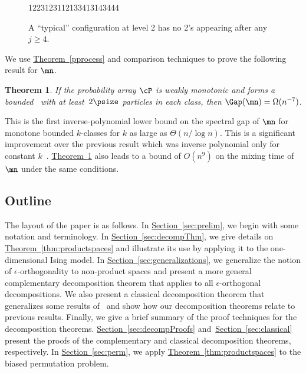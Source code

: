 \documentclass[11pt]{article}
\newtheorem{theorem}{Theorem}[section]
\providecommand{\expref}[2]{\texorpdfstring{\hyperref[#2]{#1~\ref{#2}}}{#1~\ref{#2}}}
\begin{document}
\begin{figure}[]
  \centering
           \newcommand{\one}{{\color{gray}1}}
         {\color{red} \one 223\one 23\one \one 2\one 334\one 3\one 43444}\\
      \caption{A ``typical'' configuration at level 2 has no 2's appearing after any $j\geq 4$.}
\label{fig:typical}
\end{figure}

We use \expref{Theorem}{pprocess} and comparison techniques to prove the following result for $\mn$.

\newtheorem*{mnGap}{\expref{Theorem}{thm:mnGap}}
\begin{theorem}\label{thm:mnGap} If the
%
probability array $\cP$ is  %
weakly monotonic and
%
forms  %
a bounded \kP\, with at least~$2\psize$ particles 
 in each class, then $\Gap(\mn)=\Omega(n^{-7})$.
\end{theorem}
 
\noindent This is the first inverse-polynomial %
lower   %
bound on the spectral 
gap of $\mn$ for monotone bounded $k$-classes for $k$ as large as 
$\Theta(n/\log n)$.  This is a significant improvement over the 
previous result which was inverse polynomial only for constant 
$k$~\cite{MR00}.  \expref{Theorem}{thm:mnGap} also leads to a bound of 
$O(n^9)$ on the mixing time of $\mn$ under the same conditions.

\subsection{Outline}

The layout of the paper is as follows.  In \expref{Section}{sec:prelim}, we 
begin with some notation and terminology.  In 
\expref{Section}{sec:decompThm}, we give details on 
\expref{Theorem}{thm:productspaces} and illustrate its use by applying it 
to the one-dimensional Ising model. In 
\expref{Section}{sec:generalizations}, we generalize the notion of 
$\epsilon$-orthogonality to non-product spaces and present a more 
general complementary decomposition theorem that applies to all 
$\epsilon$-orthogonal decompositions. We also present a classical 
decomposition theorem that generalizes some results of~\cite{jstv04} 
and show how our decomposition theorems relate to previous results. 
Finally, we give a brief summary of the proof techniques for the 
decomposition theorems.  \expref{Section}{sec:decompProofs} 
and~\expref{Section}{sec:classical} present the proofs of the complementary and 
classical decomposition theorems, respectively. In 
\expref{Section}{sec:perm}, we apply \expref{Theorem}{thm:productspaces} to the 
biased permutation problem. 
\end{document}
